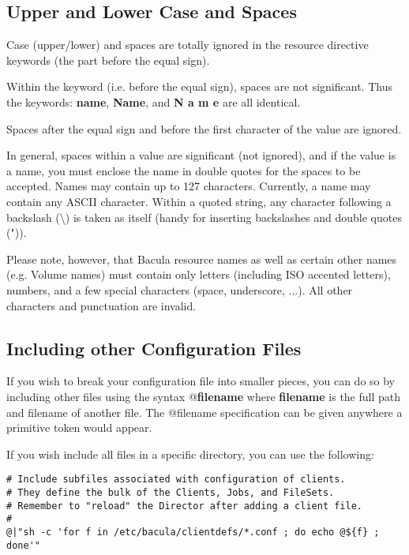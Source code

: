 \subsection{Upper and Lower Case and Spaces}

Case (upper/lower) and spaces are totally ignored in the resource directive
keywords (the part before the equal sign). 

Within the keyword (i.e. before the equal sign), spaces are not significant.
Thus the keywords: {\bf name}, {\bf Name}, and {\bf N a m e} are all
identical. 

Spaces after the equal sign and before the first character of the value are
ignored. 

In general, spaces within a value are significant (not ignored), and if the
value is a name, you must enclose the name in double quotes for the spaces to
be accepted. Names may contain up to 127 characters. Currently, a name may
contain any ASCII character. Within a quoted string, any character following a
backslash (\textbackslash{}) is taken as itself (handy for inserting
backslashes and double quotes (")).

Please note, however, that Bacula resource names as well as certain other
names (e.g. Volume names) must contain only letters (including ISO accented
letters), numbers, and a few special characters (space, underscore, ...). 
All other characters and punctuation are invalid.

\label{Includes}
\subsection{Including other Configuration Files}

If you wish to break your configuration file into smaller pieces, you can do
so by including other files using the syntax @{\bf filename} where {\bf
filename} is the full path and filename of another file. The @filename
specification can be given anywhere a primitive token would appear.

If you wish include all files in a specific directory, you can use the following:
\begin{verbatim}
# Include subfiles associated with configuration of clients.
# They define the bulk of the Clients, Jobs, and FileSets.
# Remember to "reload" the Director after adding a client file.
#
@|"sh -c 'for f in /etc/bacula/clientdefs/*.conf ; do echo @${f} ; done'"
\end{verbatim}

